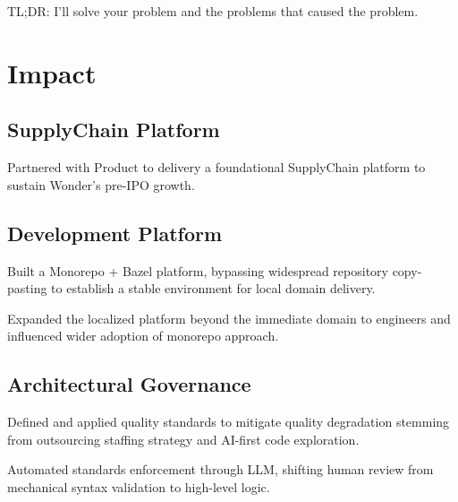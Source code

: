 \documentclass{resume}
\begin{document}
\author{Dmitry Ratnikov}
\phone{}
\streetaddress{ }
\maketitle

TL;DR: I'll solve your problem and the problems that caused the problem.

\section{Impact}

\subsection{SupplyChain Platform}

\begin{compactitem}
\item Partnered with Product to delivery a foundational SupplyChain platform to sustain Wonder's pre-IPO growth.
\end{compactitem}

\subsection{Development Platform}
\begin{compactitem}
\item Built a Monorepo + Bazel platform, bypassing widespread repository copy-pasting to establish a stable environment for local domain delivery.
\item Expanded the localized platform beyond the immediate domain to  engineers and influenced wider adoption of monorepo approach.
\end{compactitem}

\subsection{Architectural Governance}
\begin{compactitem}
\item Defined and applied quality standards to mitigate quality degradation stemming from outsourcing staffing strategy and AI-first code exploration.
\item Automated standards enforcement through LLM, shifting human review from mechanical syntax validation to high-level logic.
\end{compactitem}
\end{document}
